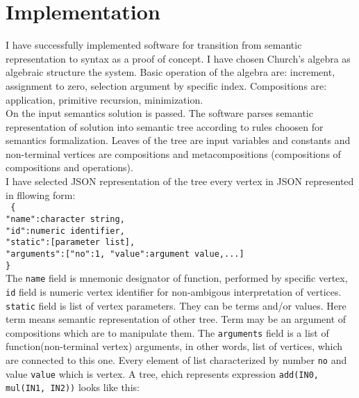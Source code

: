 \section{Implementation}
I have successfully implemented software for transition from semantic representation to syntax as a proof of concept. I have chosen Church's algebra as algebraic structure the system. Basic operation of the algebra are: increment, assignment to zero, selection argument by specific index. Compositions are: application, primitive recursion, minimization.\\
On the input semantics solution is passed. The software parses semantic representation of solution into semantic tree according to rules choosen for semantics formalization. Leaves of the tree are input variables and constants and non-terminal vertices are compositions and metacompositions (compositions of compositions and operations).\\
I have selected JSON representation of the tree every vertex in JSON represented in fllowing form:\\
\texttt{
\{\\
\indent "name":character string,\\
\indent "id":numeric identifier,\\
\indent "static":[parameter list],\\
\indent "arguments":[{"no":1, "value":argument value},...]\\
\}\\
}
The \texttt{name} field is mnemonic designator of function, performed by specific vertex, \texttt{id} field is numeric vertex identifier for non-ambigous interpretation of vertices. \texttt{static} field is list of vertex parameters. They can be terms and/or values. Here term means semantic representation of other tree. Term may be an argument of compositions which are to manipulate them. The \texttt{arguments} field is a list of function(non-terminal vertex) arguments, in other words, list of vertices, which are connected to this one. Every element of list characterized by number \texttt{no} and value \texttt{value} which is vertex.
A tree, ehich represents expression \texttt{add(IN0, mul(IN1, IN2))} looks like this:\\
